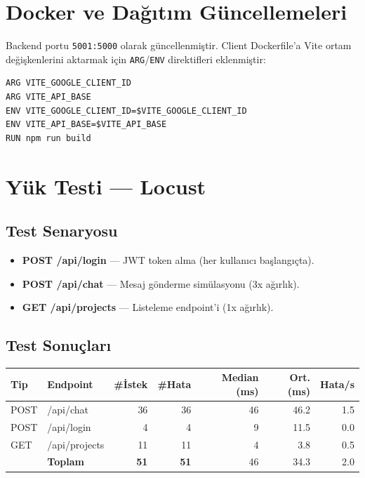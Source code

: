 \documentclass[12pt,a4paper]{article}
\begin{document}
\section{Docker ve Da\u{g}{\i}t{\i}m G\"{u}ncellemeleri}

Backend portu \texttt{5001:5000} olarak g\"{u}ncellenmi\c{s}tir. Client Dockerfile'a Vite ortam
de\u{g}i\c{s}kenlerini aktarmak i\c{c}in \texttt{ARG}/\texttt{ENV} direktifleri eklenmi\c{s}tir:

\begin{lstlisting}[caption={Client Dockerfile g\"{u}ncellemesi}]
ARG VITE_GOOGLE_CLIENT_ID
ARG VITE_API_BASE
ENV VITE_GOOGLE_CLIENT_ID=$VITE_GOOGLE_CLIENT_ID
ENV VITE_API_BASE=$VITE_API_BASE
RUN npm run build
\end{lstlisting}

\section{Y\"{u}k Testi --- Locust}

\subsection{Test Senaryosu}
\begin{itemize}
  \item \textbf{POST /api/login} --- JWT token alma (her kullan{\i}c{\i} ba\c{s}lang{\i}\c{c}ta).
  \item \textbf{POST /api/chat} --- Mesaj g\"{o}nderme sim\"{u}lasyonu (3x a\u{g}{\i}rl{\i}k).
  \item \textbf{GET /api/projects} --- Listeleme endpoint'i (1x a\u{g}{\i}rl{\i}k).
\end{itemize}

\subsection{Test Sonu\c{c}lar{\i}}
\begin{center}
\begin{tabular}{|l|l|r|r|r|r|r|}
\hline
\textbf{Tip} & \textbf{Endpoint} & \textbf{\#\.{I}stek} & \textbf{\#Hata} & \textbf{Median (ms)} & \textbf{Ort. (ms)} & \textbf{Hata/s} \\
\hline
POST & /api/chat     & 36 & 36 & 46 & 46.2 & 1.5 \\
POST & /api/login    &  4 &  4 &  9 & 11.5 & 0.0 \\
GET  & /api/projects & 11 & 11 &  4 &  3.8 & 0.5 \\
\hline
     & \textbf{Toplam} & \textbf{51} & \textbf{51} & 46 & 34.3 & 2.0 \\
\hline
\end{tabular}
\end{center}
\end{document}
